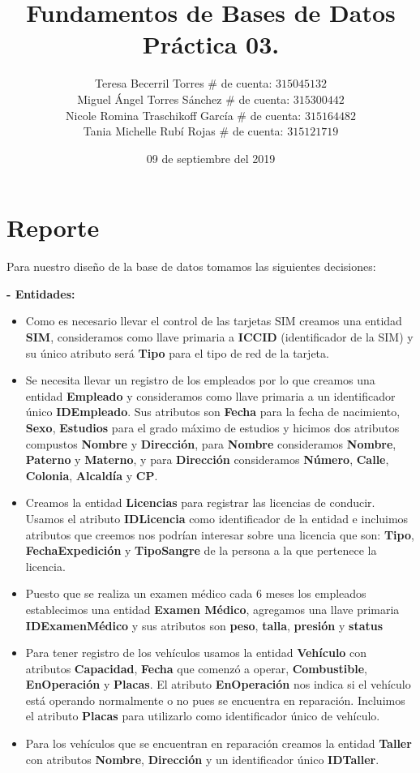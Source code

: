 \documentclass[letterpaper,11pt]{article}
\title{Fundamentos de Bases de Datos \\
       Práctica 03. }
\author{Teresa Becerril Torres
        $\#$ de cuenta: $315045132$ \\
        Miguel Ángel Torres Sánchez
        $\#$ de cuenta: $315300442$ \\
        Nicole Romina Traschikoff García
        $\#$ de cuenta: $315164482$ \\
        Tania Michelle Rubí Rojas
        $\#$ de cuenta: $315121719$}
\date{09 de septiembre del 2019}
\begin{document}
\maketitle

\section{Reporte}
Para nuestro diseño de la base de datos tomamos las siguientes decisiones:

\textbf{- Entidades: }
\begin{itemize}
\item Como es necesario llevar el control de las tarjetas SIM
      creamos una entidad \textbf{SIM}, consideramos como llave
      primaria a \textbf{ICCID} (identificador de la SIM) y su
      único atributo será \textbf{Tipo} para el tipo de red de
      la tarjeta.
\item Se necesita llevar un registro de los empleados por lo que
      creamos una entidad \textbf{Empleado} y consideramos como
      llave primaria a un identificador único \textbf{IDEmpleado}.
      Sus atributos son \textbf{Fecha} para la fecha de nacimiento,
      \textbf{Sexo}, \textbf{Estudios} para el grado máximo de estudios y
      hicimos dos atributos compustos \textbf{Nombre} y \textbf{Dirección},
      para \textbf{Nombre} consideramos \textbf{Nombre},
      \textbf{Paterno} y \textbf{Materno}, y para \textbf{Dirección}
      consideramos \textbf{Número}, \textbf{Calle}, \textbf{Colonia},
      \textbf{Alcaldía} y \textbf{CP}.
      \item Creamos la entidad  \textbf{Licencias} para registrar las licencias de conducir. Usamos el atributo  \textbf{IDLicencia} como identificador de la entidad e incluimos atributos que creemos nos podrían interesar sobre una licencia que son:  \textbf{Tipo},  \textbf{FechaExpedición} y  \textbf{TipoSangre} de la persona a la que pertenece la licencia.
      \item Puesto que se realiza un examen médico cada 6 meses los empleados
      establecimos una entidad \textbf{Examen Médico}, agregamos
      una llave primaria \textbf{IDExamenMédico} y sus atributos
      son \textbf{peso}, \textbf{talla}, \textbf{presión} y \textbf{status}
      \item Para tener registro de los vehículos usamos la entidad \textbf{Vehículo} con atributos \textbf{Capacidad},  \textbf{Fecha} que comenzó a operar, \textbf{Combustible},  \textbf{EnOperación} y  \textbf{Placas}. El atributo  \textbf{EnOperación} nos indica si el vehículo está operando normalmente o no pues se encuentra en reparación. Incluimos el atributo  \textbf{Placas} para utilizarlo como identificador único de vehículo.
      \item Para los vehículos que se encuentran en reparación creamos la entidad \textbf{Taller} con atributos \textbf{Nombre}, \textbf{Dirección} y un identificador único \textbf{IDTaller}.
      \end{itemize}
\end{document}
